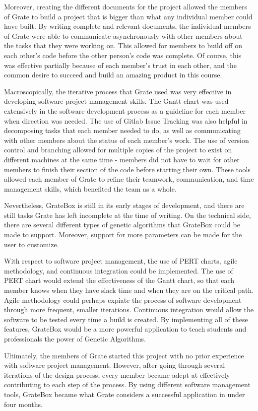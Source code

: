 \documentclass{article}
\begin{document}
\textcolor{RoyalPurple}{Moreover, creating the different documents for the project 
allowed the members 
of Grate to build a project that is bigger than what any individual member could 
have built. By writing complete and relevant documents, the individual members 
of Grate were able to  communicate asynchronously with other members about the 
tasks that they were working on. This allowed for members to build off on each 
other's code before the other person's code was complete. Of course, this was 
effective partially because of each member's trust in each other, and the common 
desire to succeed and build an amazing product in this course.}

\textcolor{RoyalPurple}{Macroscopically, the iterative process that Grate used was very 
effective in 
developing software project management skills. The Gantt chart was used 
extensively in the software development process as a guideline for each member 
when direction was needed. The use of Gitlab Issue Tracking was also helpful in 
decomposing tasks that each member needed to do, as well as communicating with 
other members about the status of each member's work. The use of version control 
and branching allowed for multiple copies of the project to exist on different 
machines at the same time - members did not have to wait for other members to 
finish their section of the code before starting their own. These tools allowed 
each member of Grate to refine their teamwork, communication, and time 
management skills, which benefited the team as a whole.}

\textcolor{RoyalPurple}{Nevertheless, GrateBox is still in its early stages of 
development, and there 
are still tasks Grate has left incomplete at the time of writing. On the 
technical side, there are several different types of genetic algorithms that 
GrateBox could be made to support. Moreover, support for more parameters can be 
made for the user to customize. }

\textcolor{RoyalPurple}{With respect to software project management, the use of PERT 
charts, agile 
methodology, and continuous integration could be implemented. The use of PERT 
chart would extend the effectiveness of the Gantt chart, so that each member 
knows when they have slack time and when they are on the critical path. Agile 
methodology could perhaps expiate the process of software development through 
more frequent, smaller iterations. Continuous integration would allow the 
software to be tested every time a build is created. By implementing all of 
these features, GrateBox would be a more powerful application to teach students 
and professionals the power of Genetic Algorithms.}

\textcolor{RoyalPurple}{Ultimately, the members of Grate started this project with no 
prior experience 
with software project management. However, after going through several 
iterations of the design process, every member became adept at effectively 
contributing to each step of the process. By using different software management 
tools, GrateBox became what Grate considers a successful application in under 
four months.}
\end{document}
